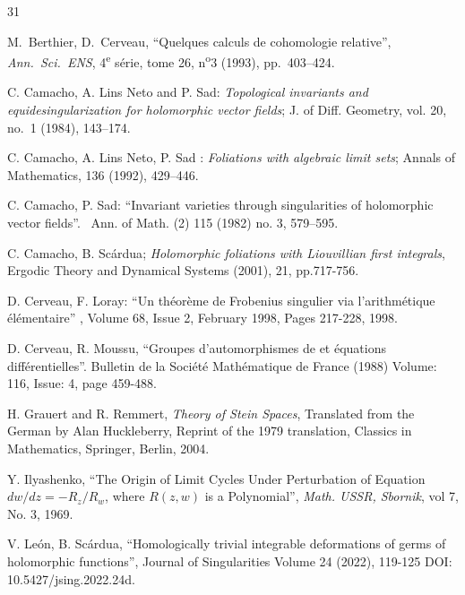 \documentclass[11pt,a4paper]{amsart}
\theoremstyle{definition}
\begin{document}

\begin{thebibliography}{31}
\frenchspacing

 M.~Berthier, D.~Cerveau,
``Quelques calculs de cohomologie relative'',
\emph{Ann.\ Sci.\ ENS}, 4\textsuperscript{e} série,
tome 26, n\textsuperscript{o}3 (1993), pp.~403--424.

\bibitem{[C-LN-S]} C. Camacho, A. Lins Neto and P. Sad: {\it
 Topological invariants and
equidesingularization for holomorphic vector fields}; J. of Diff. 
Geometry, vol.
20, no.\ 1 (1984), 143--174.

\bibitem{[C-LN-Sannals]} {   C. Camacho, A. Lins Neto, P. Sad} : 
 {\em Foliations with algebraic limit
sets}; Annals of Mathematics, 136 (1992), 429--446.

 C. Camacho, P. Sad: { ``Invariant varieties
through singularities of holomorphic vector fields''}. \ Ann. of Math.
(2) 115 (1982) no. 3, 579--595.



 { C. Camacho, B. Sc\'ardua};
{\em Holomorphic foliations with Liouvillian first integrals},
{Ergodic Theory and Dynamical Systems} (2001), 21, pp.717-756.


 D. Cerveau, F. Loray: 
``Un théorème de Frobenius singulier via l'arithmétique élémentaire''
, Volume 68, Issue 2, February 1998, Pages 217-228,  1998.

 

 D. Cerveau, R. Moussu, { ``Groupes 
    d'automorphismes de et équations différentielles''}.
Bulletin de la Société Mathématique de France (1988)
Volume: 116, Issue: 4, page 459-488.








 H. Grauert and R. Remmert, \textit{Theory of Stein 
    Spaces}, Translated from the German by Alan Huckleberry,
Reprint of the 1979 translation, Classics in Mathematics, Springer, 
Berlin, 2004.



 Y. Ilyashenko, ``The Origin of Limit Cycles Under Perturbation of Equation $dw/dz = -R_z/R_w$, where $R(z,w)$ is a Polynomial'', {\it Math. USSR, Sbornik}, vol 7, No. 3, 1969.

 V. León, B. Scárdua, ``Homologically trivial integrable deformations of germs of holomorphic functions'', Journal of Singularities
Volume 24 (2022), 119-125
DOI: 10.5427/jsing.2022.24d.



\end{thebibliography}
\end{document}
